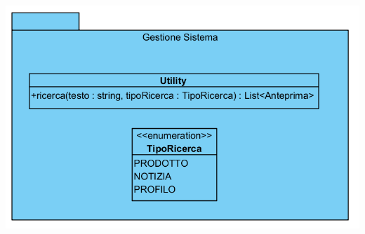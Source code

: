 \begin{center}
			\includegraphics[width=\textwidth]{assets/visualParadigm/classi/GestioneSistema}
\end{center}


